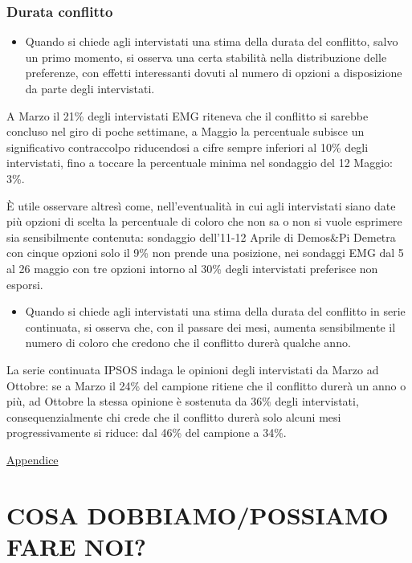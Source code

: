 \documentclass[
]{book}
\providecommand{\tightlist}{%
  \setlength{\itemsep}{0pt}\setlength{\parskip}{0pt}}
\begin{document}
\hypertarget{durata-conflitto}{%
\subsection{Durata conflitto}\label{durata-conflitto}}

\begin{itemize}
\tightlist
\item
  Quando si chiede agli intervistati una stima della durata del conflitto, salvo un primo momento, si osserva una certa stabilità nella distribuzione delle preferenze, con effetti interessanti dovuti al numero di opzioni a disposizione da parte degli intervistati.
\end{itemize}

A Marzo il 21\% degli intervistati EMG riteneva che il conflitto si sarebbe concluso nel giro di poche settimane, a Maggio la percentuale subisce un significativo contraccolpo riducendosi a cifre sempre inferiori al 10\% degli intervistati, fino a toccare la percentuale minima nel sondaggio del 12 Maggio: 3\%.

È utile osservare altresì come, nell'eventualità in cui agli intervistati siano date più opzioni di scelta la percentuale di coloro che non sa o non si vuole esprimere sia sensibilmente contenuta: sondaggio dell'11-12 Aprile di Demos\&Pi Demetra con cinque opzioni solo il 9\% non prende una posizione, nei sondaggi EMG dal 5 al 26 maggio con tre opzioni intorno al 30\% degli intervistati preferisce non esporsi.

\begin{itemize}
\tightlist
\item
  Quando si chiede agli intervistati una stima della durata del conflitto in serie continuata, si osserva che, con il passare dei mesi, aumenta sensibilmente il numero di coloro che credono che il conflitto durerà qualche anno.
\end{itemize}

La serie continuata IPSOS indaga le opinioni degli intervistati da Marzo ad Ottobre: se a Marzo il 24\% del campione ritiene che il conflitto durerà un anno o più, ad Ottobre la stessa opinione è sostenuta da 36\% degli intervistati, consequenzialmente chi crede che il conflitto durerà solo alcuni mesi progressivamente si riduce: dal 46\% del campione a 34\%.

\href{https://github.com/LucianaFazio/Ucrania/blob/main/PDF_Appendice/IV.\%20La\%20guerra\%20e\%20il\%20suo\%20andamento\%20v.4.pdf}{Appendice}

\hypertarget{cosa-dobbiamopossiamo-fare-noi}{%
\chapter{COSA DOBBIAMO/POSSIAMO FARE NOI?}\label{cosa-dobbiamopossiamo-fare-noi}}
\end{document}
